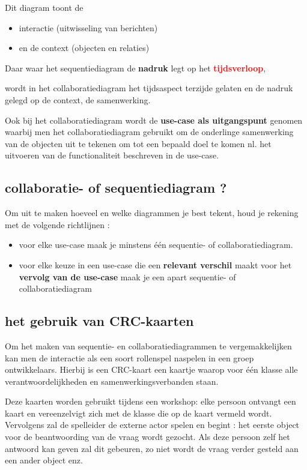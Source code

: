 {Dit diagram toont de

\begin{itemize}
    \item interactie (uitwisseling van berichten)
    \item en de context (objecten en relaties)
\end{itemize}

Daar waar het sequentiediagram de \textbf{nadruk} legt op het \textcolor{red}{\textbf{tijdsverloop}}, 

wordt in het collaboratiediagram het tijdsaspect terzijde gelaten en de nadruk gelegd op de context, de samenwerking.

Ook bij het collaboratiediagram wordt de \textbf{use-case als uitgangspunt} genomen waarbij men het collaboratiediagram gebruikt om de onderlinge samenwerking van de objecten uit te tekenen om tot een bepaald doel te komen nl. het uitvoeren van de functionaliteit beschreven in de use-case.

\subsection{collaboratie- of sequentiediagram ?}

Om uit te maken hoeveel en welke diagrammen je best tekent, houd je rekening met de volgende richtlijnen :

\begin{itemize}
    \item voor elke use-case maak je minstens één sequentie- of collaboratiediagram.
    \item voor elke keuze in een use-case die een \textbf{relevant verschil} maakt voor het\textbf{ vervolg van de use-case} maak je een apart sequentie- of collaboratiediagram
\end{itemize}

\subsection{het gebruik van CRC-kaarten}

Om het maken van sequentie- en collaboratiediagrammen te vergemakkelijken kan men de interactie als een soort rollenspel naspelen in een groep ontwikkelaars. Hierbij is een CRC-kaart een kaartje waarop voor één klasse alle verantwoordelijkheden en samenwerkingsverbanden staan.

Deze kaarten worden gebruikt tijdens een workshop: elke persoon ontvangt een kaart en vereenzelvigt zich met de klasse die op de kaart vermeld wordt. Vervolgens zal de spelleider de externe actor spelen en begint : het eerste object voor de beantwoording van de vraag wordt gezocht. Als deze persoon zelf het antwoord kan geven zal dit gebeuren, zo niet wordt de vraag verder gesteld aan een ander object enz.

}
